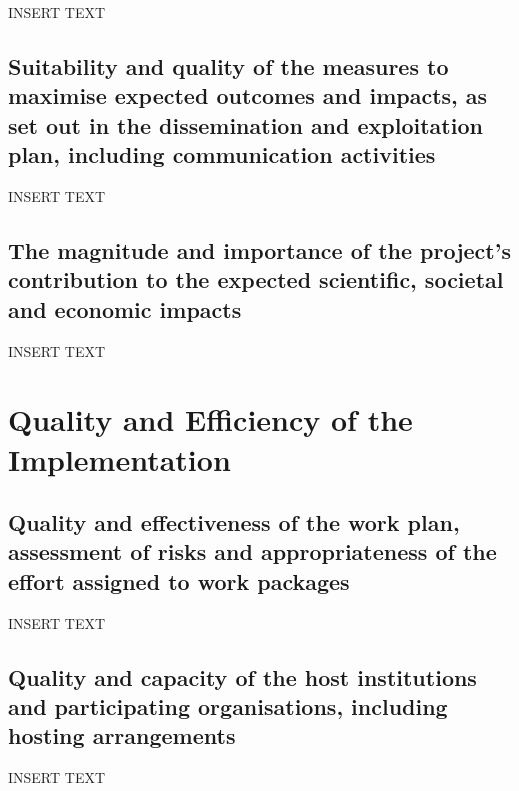\documentclass[11pt,a4paper]{article}
\begin{document}
	INSERT TEXT
	
	\subsection{Suitability and quality of the measures to maximise expected outcomes and impacts,
		as set out in the dissemination and exploitation plan, including communication activities \\ }
	
	INSERT TEXT  
	
	
	\subsection{The magnitude and importance of the project’s contribution to the expected scientific,
		societal and economic impacts}
	
	INSERT TEXT

	
	 
	
	
	\section{Quality and Efficiency of the Implementation  
	}\label{sec:Quality}
	
	\subsection{Quality and effectiveness of the work plan, assessment of risks and appropriateness of the effort assigned to work packages}

	INSERT TEXT

	\subsection{Quality and capacity of the host institutions and participating organisations, including hosting arrangements}

	INSERT TEXT 
	

\end{document}
